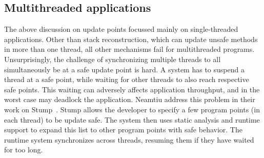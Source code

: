 \subsection{Multithreaded applications}
The above discussion on update points focussed mainly on single-threa\-d\-ed
applications. Other than stack reconstruction, which can update unsafe
methods in more than one thread, all other mechanisms fail for
multithreaded programs. Unsurprisingly, the challenge of synchronizing
multiple threads to all simultaneously be at a safe update point is hard. A
\USD system has to suspend a thread at a safe point, while waiting for
other threads to also reach respective safe points. This waiting can
adversely affects application throughput, and in the worst case may
deadlock the application. Neamtiu \EA address this problem in their work on
Stump~\cite{neamtiu09stump}. Stump allows the developer to specify a few
program points (in each thread) to be update safe. The system then uses
static analysis and runtime support to expand this list to other program
points with safe behavior. The runtime system synchronizes across threads,
resuming them if they have waited for too long.
